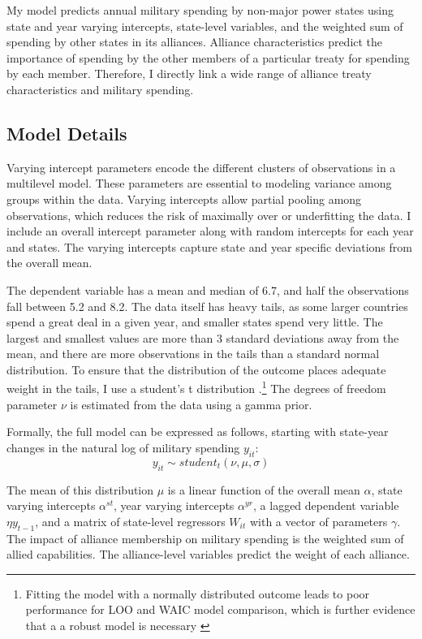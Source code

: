 \documentclass[12pt]{article}
\begin{document}
My model predicts annual military spending by non-major power states using state and year varying intercepts, state-level variables, and the weighted sum of spending by other states in its alliances. Alliance characteristics predict the importance of spending by the other members of a particular treaty for spending by each member. Therefore, I directly link a wide range of alliance treaty characteristics and military spending. 

\subsection*{Model Details}

Varying intercept parameters encode the different clusters of observations in a multilevel model. These parameters are essential to modeling variance among groups within the data. Varying intercepts allow partial pooling among observations, which reduces the risk of maximally over or underfitting the data. I include an overall intercept parameter along with random intercepts for each year and states. The varying intercepts capture state and year specific deviations from the overall mean.

The dependent variable has a mean and median of 6.7, and half the observations fall between 5.2 and 8.2. The data itself has heavy tails, as some larger countries spend a great deal in a given year, and smaller states spend very little. The largest and smallest values are more than 3 standard deviations away from the mean, and there are more observations in the tails than a standard normal distribution. To ensure that the distribution of the outcome places adequate weight in the tails, I use a student's t distribution \citep{JuarezSteele2010}.\footnote{Fitting the model with a normally distributed outcome leads to poor performance for LOO and WAIC model comparison, which is further evidence that a a robust model is necessary \citep{Vehtarietal2017}}  The degrees of freedom parameter $\nu$ is estimated from the data using a gamma prior.

Formally, the full model can be expressed as follows, starting with state-year changes in the natural log of military spending $y_{it}$:
\begin{equation}
y_{it} \sim student_t(\nu, \mu, \sigma) 
\end{equation}

The mean of this distribution $\mu$ is a linear function of the overall mean $\alpha$, state varying intercepts $\alpha^{st}$, year varying intercepts $\alpha^{yr}$, a lagged dependent variable $\eta y_{t-1}$, and a matrix of state-level regressors $W_{it}$ with a vector of parameters $\gamma$. The impact of alliance membership on military spending is the weighted sum of allied capabilities. The alliance-level variables predict the weight of each alliance. 
\end{document}
